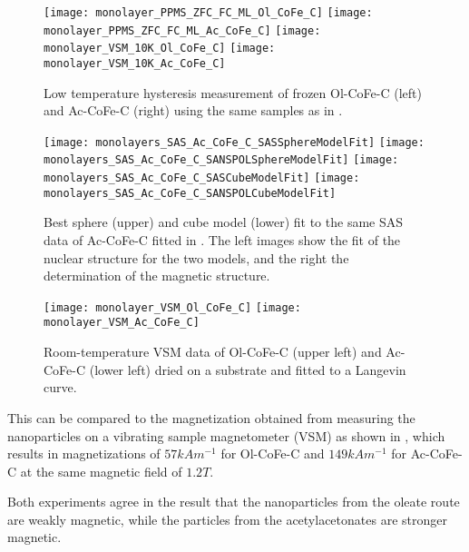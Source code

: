 \begin{figure}[tb]
  \centering
  \texttt{[image: monolayer\_PPMS\_ZFC\_FC\_ML\_Ol\_CoFe\_C]}
  \texttt{[image: monolayer\_PPMS\_ZFC\_FC\_ML\_Ac\_CoFe\_C]}
  \texttt{[image: monolayer\_VSM\_10K\_Ol\_CoFe\_C]}
  \texttt{[image: monolayer\_VSM\_10K\_Ac\_CoFe\_C]}
  \caption{\label{fig:monolaye rs:nanoparticle:vsm10K}Low temperature hysteresis measurement of frozen Ol-CoFe-C (left) and Ac-CoFe-C (right) using the same samples as in .}
\end{figure}

\begin{figure}[tb]
  \centering
  \texttt{[image: monolayers\_SAS\_Ac\_CoFe\_C\_SASSphereModelFit]}
  \texttt{[image: monolayers\_SAS\_Ac\_CoFe\_C\_SANSPOLSphereModelFit]}
  \texttt{[image: monolayers\_SAS\_Ac\_CoFe\_C\_SASCubeModelFit]}
  \texttt{[image: monolayers\_SAS\_Ac\_CoFe\_C\_SANSPOLCubeModelFit]}
  \caption{\label{fig:monolayers:nanoparticle:sas:SphereCubeFit}Best sphere (upper) and cube model (lower) fit to the same SAS data of Ac-CoFe-C fitted in . The left images show the fit of the nuclear structure for the two models, and the right the determination of the magnetic structure.}
\end{figure}


\begin{figure}[tb]
  \centering
  \texttt{[image: monolayer\_VSM\_Ol\_CoFe\_C]}
  \texttt{[image: monolayer\_VSM\_Ac\_CoFe\_C]}
  \caption{\label{fig:monolayers:nanoparticle:vsm}Room-temperature VSM data of Ol-CoFe-C (upper left) and Ac-CoFe-C (lower left) dried on a substrate and fitted to a Langevin curve.}
\end{figure}

This can be compared to the magnetization obtained from measuring the nanoparticles on a vibrating sample magnetometer (VSM) as shown in , which results in magnetizations of $57 \unit{kAm^{-1}}$ for Ol-CoFe-C and $149 \unit{kAm^{-1}}$ for Ac-CoFe-C at the same magnetic field of $1.2 \unit{T}$.

Both experiments agree in the result that the nanoparticles from the oleate route are weakly magnetic, while the particles from the acetylacetonates are stronger magnetic.

